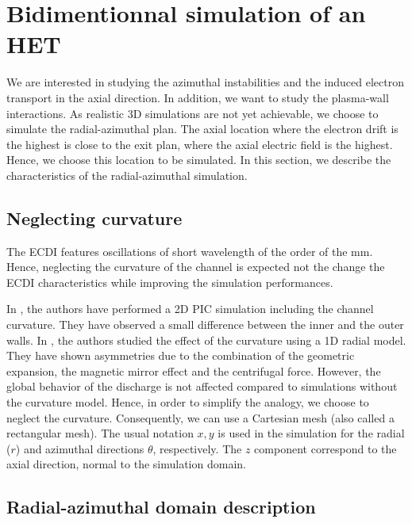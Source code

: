 
\section{Bidimentionnal simulation of an \ac{HET}}

We are interested in studying the azimuthal instabilities and the induced electron transport in the axial direction.
In addition, we want to study the plasma-wall interactions.
As realistic \ac{3D} simulations are not yet achievable, we choose to simulate the radial-azimuthal plan.
The axial location where the electron drift is the highest is close to the exit plan, where the axial electric field is the highest.
Hence, we choose this location to be simulated.
In this section, we describe the characteristics of the radial-azimuthal simulation.


\subsection{Neglecting curvature}
The \ac{ECDI} features oscillations of short wavelength of the order of the mm.
Hence, neglecting the curvature of the channel is expected not the change the \ac{ECDI} characteristics while improving the simulation performances.

In  \citet{heron2013},  the authors have performed a \ac{2D} \ac{PIC} simulation including the channel curvature.
They have observed a small difference between the inner and the outer walls.
In  \citet{dominguez-vazquez2018}, the authors studied the effect of the curvature using a \ac{1D} radial model.
They have shown asymmetries due to the combination of the geometric expansion, the magnetic mirror effect and the centrifugal force.
However, the global behavior of the discharge is not affected compared to simulations without the curvature model.
Hence, in order to simplify the analogy, we choose to neglect the curvature.
Consequently, we can use a Cartesian mesh (also called a rectangular mesh).
The usual notation $x,y$ is used in the simulation for the radial ($r$) and azimuthal directions $\theta$, respectively.
The $z$ component correspond to the axial direction, normal to the simulation domain.

\subsection{Radial-azimuthal domain description}

